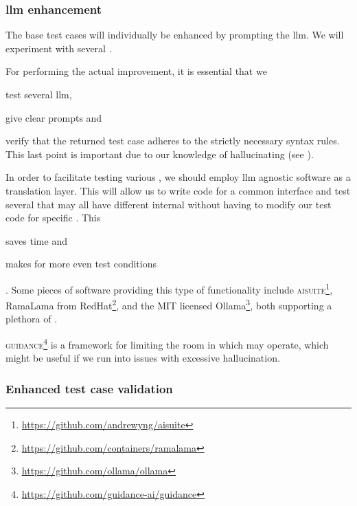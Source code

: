 \subsubsection{\acrshort{llm} enhancement}\label{sec:llmEnhancement}

The base test cases will individually be enhanced by prompting the
\acrshort{llm}. We will experiment with several .

For performing the actual improvement, it is essential that we \begin{inparaenum}
    \item test several \acrshort{llm},
    \item give clear prompts
    and
    \item verify that the returned test case adheres to the strictly necessary
    syntax rules. This last point is important due to our knowledge of
     hallucinating (see ).
\end{inparaenum}

In order to facilitate testing various , we should employ
\acrshort{llm} agnostic software as a translation layer. This will allow us to
write code for a common interface and test several  that may all
have different internal  without having to modify our test code
for specific . This \begin{inparaenum}
    \item saves time
    and
    \item makes for more even test conditions \end{inparaenum}. Some pieces of software providing
this type of functionality include
\textsc{aisuite}\footnote{\url{https://github.com/andrewyng/aisuite}}, RamaLama from
RedHat\footnote{\url{https://github.com/containers/ramalama}}, and the MIT licensed
Ollama\footnote{\url{https://github.com/ollama/ollama}}, both supporting a plethora of
.

\textsc{guidance}\footnote{\url{https://github.com/guidance-ai/guidance}} is a
framework for limiting the room in which  may operate, which
might be useful if we run into issues with excessive hallucination.


\subsubsection{Enhanced test case validation}

